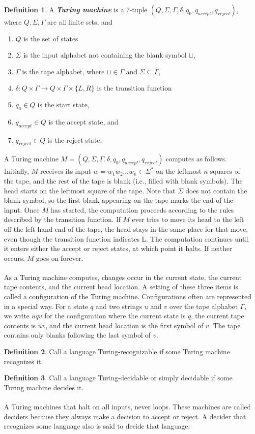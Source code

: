 \documentclass[11pt]{article}
\theoremstyle{definition}
\newtheorem{defn}{Definition}[section]
\begin{document}
\begin{defn}
A \textbf{\textit{Turing machine}} is a 7-tuple $(Q,\Sigma, \Gamma, \delta, q_0, q_{accept},q_{reject})$, where $Q,\Sigma, \Gamma$ are all finite sets, and
\begin{enumerate}
    \item $Q$ is the set of states
    \item $\Sigma$ is the input alphabet not containing the blank symbol $\sqcup$,
    \item $\Gamma$ is the tape alphabet, where $\sqcup\in\Gamma$ and $\Sigma\subseteq\Gamma$,
    \item $\delta:Q\times\Gamma\to Q\times\Gamma\times \{L,R\}$ is the transition function
    \item $q_0\in Q$ is the start state, 
    \item $q_{accept}\in Q$ is the accept state, and 
    \item $q_{reject}\in Q$ is the reject state.
\end{enumerate}
A Turing machine $M = (Q,\Sigma, \Gamma, \delta, q_0, q_{accept},q_{reject})$ computes as follows. Initially, $M$ receives its input $w = w_1w_2\ldots w_n \in\Sigma^*$ on the leftmost $n$ squares of the tape, and the rest of the tape is blank (i.e., filled with blank symbols). The head starts on the leftmost square of the tape. Note that $\Sigma$ does not contain the blank symbol, so the first blank appearing on the tape marks the end of the input. Once $M$ has started, the computation proceeds according to the rules described by the transition function. If $M$ ever tries to move its head to the left off the left-hand end of the tape, the head stays in the same place for that move, even though the transition function indicates L. The computation continues until it enters either the accept or reject states, at which point it halts. If neither occurs, $M$ goes on forever.\\\\
As a Turing machine computes, changes occur in the current state, the current tape contents, and the current head location. A setting of these three items is called a configuration of the Turing machine. Configurations often are represented in a special way. For a state $q$ and two strings $u$ and $v$ over the tape alphabet $\Gamma$, we write $u q v$ for the configuration where the current state is $q$, the current tape contents is $uv$, and the current head location is the first symbol of $v$. The tape contains only blanks following the last symbol of $v$. 
\end{defn}
\begin{defn}
Call a language Turing-recognizable if some Turing machine recognizes it.
\end{defn}
\begin{defn}
Call a language Turing-decidable or simply decidable if some Turing machine decides it.\\\\
A Turing machines that halt on all inputs, never loops. These machines are called deciders because they always make a decision to accept or reject. A decider that recognizes some language also is said to decide that language.
\end{defn}
\end{document}
